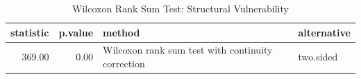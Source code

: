 \begin{table}[ht]
\centering
\begin{tabular}{rrll}
  \hline
statistic & p.value & method & alternative \\ 
  \hline
369.00 & 0.00 & Wilcoxon rank sum test with continuity correction & two.sided \\ 
   \hline
\end{tabular}
\caption{Wilcoxon Rank Sum Test: Structural Vulnerability} 
\end{table}
